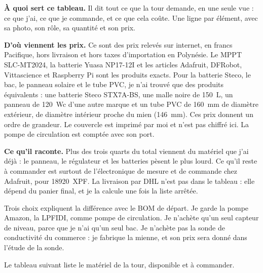 \textbf{À quoi sert ce tableau.} Il dit tout ce que la tour demande, en une seule vue : ce que j'ai, ce que je commande, et ce que cela coûte. Une ligne par élément, avec sa photo, son rôle, sa quantité et son prix.

\textbf{D'où viennent les prix.} Ce sont des prix relevés sur internet, en francs Pacifique, hors livraison et hors taxes d'importation en Polynésie. Le MPPT SLC-MT2024, la batterie Yuasa NP17-12I et les articles Adafruit, DFRobot, Vittascience et Raspberry Pi sont les produits exacts. Pour la batterie Steco, le bac, le panneau solaire et le tube PVC, je n'ai trouvé que des produits équivalents : une batterie Steco STX7A-BS, une malle noire de \qty{150}{L}, un panneau de \qty{120}{Wc} d'une autre marque et un tube PVC de \qty{160}{mm} de diamètre extérieur, de diamètre intérieur proche du mien (\qty{146}{mm}). Ces prix donnent un ordre de grandeur. Le couvercle est imprimé par moi et n'est pas chiffré ici. La pompe de circulation est comptée avec son port.

\textbf{Ce qu'il raconte.} Plus des trois quarts du total viennent du matériel que j'ai déjà : le panneau, le régulateur et les batteries pèsent le plus lourd. Ce qu'il reste à commander est surtout de l'électronique de mesure et de commande chez Adafruit, pour \qty{18920}{XPF}. La livraison par DHL n'est pas dans le tableau : elle dépend du panier final, et je la calcule une fois la liste arrêtée.

Trois choix expliquent la différence avec le BOM de départ. Je garde la pompe Amazon, la LPFIDI, comme pompe de circulation. Je n'achète qu'un seul capteur de niveau, parce que je n'ai qu'un seul bac. Je n'achète pas la sonde de conductivité du commerce : je fabrique la mienne, et son prix sera donné dans l'étude de la sonde.

Le tableau suivant liste le matériel de la tour, disponible et à commander.

